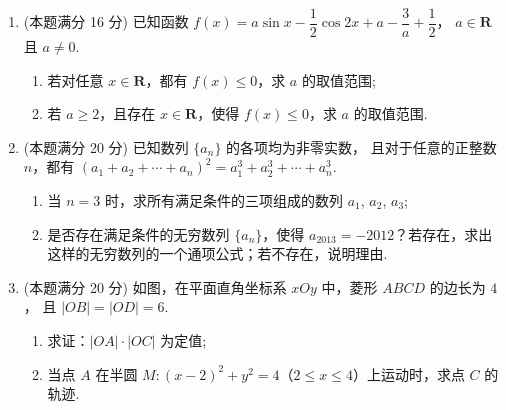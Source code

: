 \documentclass{chsmc}
\begin{document}
\begin{enumerate}[resume]
	\item (本题满分 16 分) 已知函数
		$f(x) = a\sin x - \dfrac{1}{2}\cos 2x + a - \dfrac{3}{a} + \dfrac{1}{2}$，
		$a \in \mathbf{R}$ 且 $a \neq 0$.
    \begin{enumerate}[(1)]
      \item 若对任意 $x \in \mathbf{R}$，都有 $f(x) \leqslant 0$，求 $a$ 的取值范围;
      \item 若 $a \geqslant 2$，且存在 $x \in \mathbf{R}$，使得 $f(x) \leqslant 0$，求 $a$ 的取值范围.
    \end{enumerate}
	\item (本题满分 20 分) 已知数列 $\{a_n\}$ 的各项均为非零实数，
		且对于任意的正整数 $n$，都有 $(a_1+a_2+\cdots+a_n)^2 = a_1^3+a_2^3+\cdots+a_n^3$.
    \begin{enumerate}[(1)]
      \item 当 $n = 3$ 时，求所有满足条件的三项组成的数列 $a_1$, $a_2$, $a_3$;
      \item 是否存在满足条件的无穷数列 $\{a_n\}$，使得 $a_{2013} = -2012$？若存在，求出这样的无穷数列的一个通项公式；若不存在，说明理由.
    \end{enumerate}
	\item (本题满分 20 分) 如图，在平面直角坐标系 $xOy$ 中，菱形 $ABCD$ 的边长为 $4$，
		且 $|OB| = |OD| = 6$.
    \begin{enumerate}[(1)]
      \item 求证：$|OA|\cdot|OC|$ 为定值;
      \item 当点 $A$ 在半圆 $M\colon (x-2)^2 + y^2 = 4$（$2 \leqslant x \leqslant 4$）上运动时，求点 $C$ 的轨迹.
    \end{enumerate}
\end{enumerate}
\end{document}
